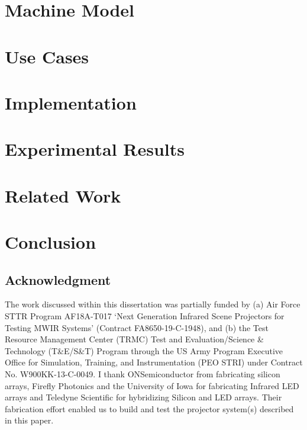 \documentclass{udthesis}
\begin{document}
    \chapter{Machine Model}
        
    \chapter{Use Cases}
        
    \chapter{Implementation}
        
    \chapter{Experimental Results}
        
    \chapter{Related Work}
        
    \chapter*{Conclusion}
        

    \section*{Acknowledgment}
        The work discussed within this dissertation was partially funded by (a) Air Force STTR Program AF18A-T017 `Next Generation Infrared Scene Projectors for Testing MWIR Systems' (Contract FA8650-19-C-1948), and (b) the Test Resource Management Center (TRMC) Test and Evaluation/Science \& Technology (T\&E/S\&T) Program through the US Army Program Executive Office for Simulation, Training, and Instrumentation (PEO STRI) under Contract No. W900KK-13-C-0049. I thank ONSemiconductor from fabricating silicon arrays, Firefly Photonics and the University of Iowa for fabricating Infrared LED arrays and Teledyne Scientific for hybridizing Silicon and LED arrays. Their fabrication effort enabled us to build and test the projector system(s) described in this paper.
\end{document}
